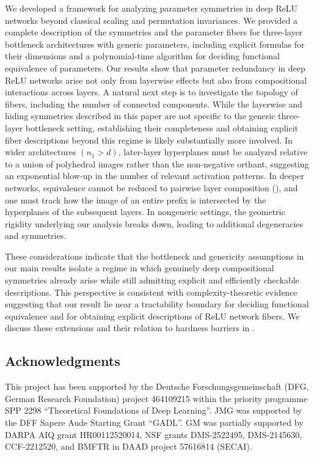 \documentclass{article}
\theoremstyle{definition}
\begin{document}
We developed a framework for analyzing parameter symmetries in deep ReLU networks beyond classical scaling and permutation invariances. 
We provided a complete description of the symmetries and the parameter fibers for three-layer bottleneck architectures with generic parameters, including explicit formulas for their dimensions and a polynomial-time algorithm for deciding functional equivalence of parameters. 
%
Our results show that parameter redundancy in deep ReLU networks arise not only from layerwise effects but also from compositional interactions across layers. 
%
A natural next step is to investigate the topology of fibers, including 
the number of connected components. 
%
While the layerwise and hiding symmetries described in this paper are not specific to the generic three-layer bottleneck setting, 
%  
establishing their completeness and obtaining explicit fiber descriptions beyond this regime is likely substantially more involved. 
In wider architectures $(n_1>d)$, later-layer hyperplanes must be analyzed relative to a union of polyhedral images rather than the non-negative orthant, 
suggesting an exponential blow-up in the number of relevant activation patterns. 
In deeper networks, equivalence cannot be reduced to pairwise layer composition (), and one must track how the image of an entire prefix is intersected by the hyperplanes of the subsequent layers. 
In nongeneric settings, the geometric rigidity underlying our analysis breaks down, leading to additional degeneracies and symmetries.  

These considerations indicate that the bottleneck and genericity assumptions in our main results isolate a regime in which genuinely deep compositional symmetries already arise while still admitting explicit and efficiently checkable descriptions. 
%
This perspective is consistent with complexity-theoretic evidence suggesting that our result lie near a tractability boundary for deciding functional equivalence and for obtaining explicit descriptions of ReLU network fibers. We discuss these extensions and their relation to hardness barriers in . 




 \subsection*{Acknowledgments} 
 This project has been supported by the
 Deutsche Forschungsgemeinschaft (DFG, German Research Foundation)  project 464109215 
 within the priority programme SPP 2298 ``Theoretical Foundations of Deep Learning''.  
 JMG was supported by the DFF Sapere Aude Starting Grant ``GADL''. 
 GM was partially supported by 
DARPA AIQ grant HR00112520014, 
NSF grants 
DMS-2522495, 
DMS-2145630, 
CCF-2212520, 
and BMFTR in DAAD project 57616814 (SECAI). 
\end{document}
